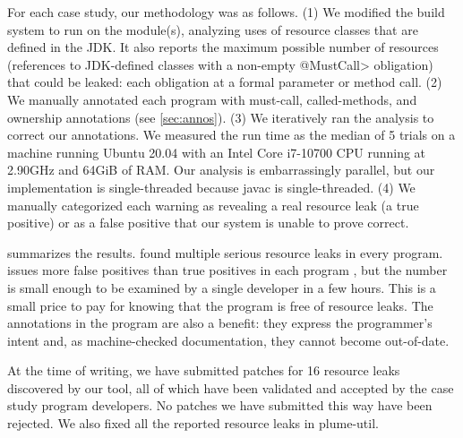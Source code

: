 For each case study, our methodology was as follows.
(1)
We modified the
build system to run \tool on the module(s), analyzing uses of resource
classes that are defined in the JDK\@.
It also reports the maximum possible number of resources (references to JDK-defined
classes with a non-empty \<@MustCall> obligation) that could be
leaked:  each obligation at a formal parameter or method call.
(2) We manually
annotated each program with must-call, called-methods, and ownership
annotations (see \cref{sec:annos}).
(3) We iteratively ran the analysis to correct our annotations.
We measured the run time
as the median of 5 trials on
a machine running Ubuntu 20.04 with an Intel Core i7-10700 CPU running at 2.90GHz and 64GiB of RAM\@.
Our analysis is embarrassingly parallel, but our implementation is
single-threaded because javac is single-threaded.
(4) We manually categorized each warning as revealing a
real resource leak (a true positive) or as a
false positive that our system is unable to prove correct.

 summarizes the results. \Tool found multiple
serious resource leaks in every program. \Tool issues
more false positives than true positives in each program
, but
the number is small enough to be examined by a single developer in a
few hours.  This is a small price to pay for knowing that the program is
free of resource leaks.   The annotations in the program are
also a benefit: they
express the programmer's intent and, as machine-checked documentation,
they cannot become out-of-date.

At the time of writing, we have submitted patches for 16 resource leaks
discovered by our tool, all of which have been validated and accepted by the
case study program developers.   No patches
we have submitted this way have been rejected.  We also fixed all the reported
resource leaks in plume-util.  

